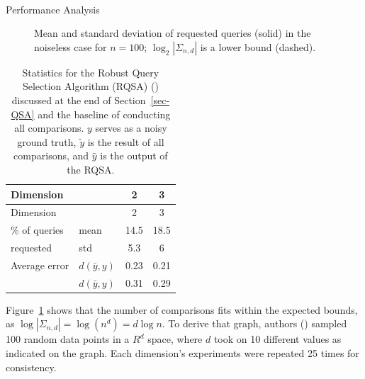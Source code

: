 \documentclass[
  letterpaper,
  numbers=noenddot,
  DIV=11,
  oneside]{scrreprt}
\makeatletter
\let\oldparagraph\paragraph
\renewcommand{\paragraph}{
    \@ifstar
      \xxxParagraphStar
      \xxxParagraphNoStar
  }
\newcommand{\xxxParagraphStar}[1]{\oldparagraph*{#1}\mbox{}}
\newcommand{\xxxParagraphNoStar}[1]{\oldparagraph{#1}\mbox{}}
\theoremstyle{remark}
\makeatother
\begin{document}
\paragraph{Performance Analysis}\label{sec-QSA}

\begin{figure}


\caption{\label{fig-rand_n}Mean and standard deviation of requested
queries (solid) in the noiseless case for \(n = 100\);
\(\log_2|\Sigma_{n,d}|\) is a lower bound (dashed).}

\end{figure}%

\begin{longtable}[]{@{}llcc@{}}
\caption{Statistics for the Robust Query Selection Algorithm (RQSA)
() discussed at the end of
Section~\ref{sec-QSA} and the baseline of conducting all comparisons.
\(y\) serves as a noisy ground truth, \(\tilde{y}\) is the result of all
comparisons, and \(\hat{y}\) is the output of the
RQSA.}\label{tbl-geo_acc}\tabularnewline
\toprule\noalign{}
Dimension & & 2 & 3 \\
\midrule\noalign{}
\endfirsthead
\toprule\noalign{}
Dimension & & 2 & 3 \\
\midrule\noalign{}
\endhead
\bottomrule\noalign{}
\endlastfoot
\% of queries & mean & 14.5 & 18.5 \\
requested & std & 5.3 & 6 \\
Average error & \(d(\bar{y}, y)\) & 0.23 & 0.21 \\
& \(d(\bar{y}, y)\) & 0.31 & 0.29 \\
\end{longtable}

Figure~\ref{fig-rand_n} shows that the number of comparisons fits within
the expected bounds, as \(\log|\Sigma_{n,d}| = \log(n^d) = d\log n\). To
derive that graph, authors ()
sampled 100 random data points in a \(R^d\) space, where \(d\) took on
10 different values as indicated on the graph. Each dimension's
experiments were repeated 25 times for consistency.
\end{document}
